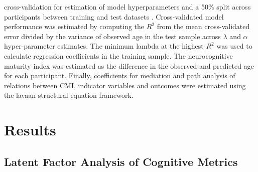 \documentclass[utf8]{frontiersSCNS} %
\begin{document}
cross-validation for estimation of model hyperparameters and a 50\% split across participants between training and test datasets \citep{FriedmanHastieTibshirani2010, friedman2009glmnet}. Cross-validated model performance was estimated by computing the $R^2$ from the mean cross-validated error divided by the variance of observed age in the test sample across $\lambda$ and $\alpha$ hyper-parameter estimates. The minimum lambda at the highest $R^2$ was used to calculate regression coefficients in the training sample. The neurocognitive maturity index was estimated as the difference in the observed and predicted age for each participant. Finally, coefficients for mediation and path analysis of relations between CMI, indicator variables and outcomes were estimated using the lavaan structural equation framework.
\section{Results} 
\subsection{Latent Factor Analysis of Cognitive Metrics} 
\end{document}
